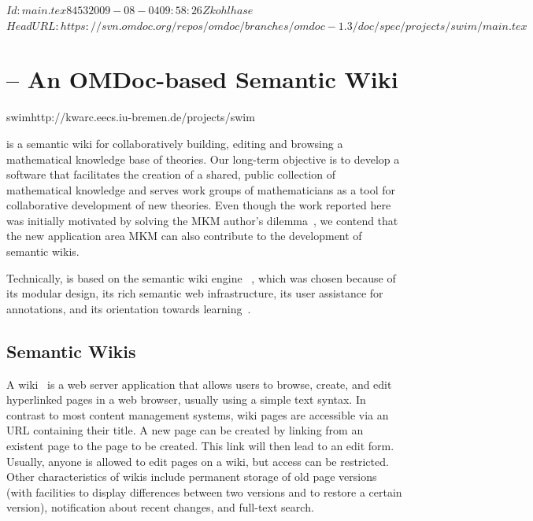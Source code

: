 \svnInfo $Id: main.tex 8453 2009-08-04 09:58:26Z kohlhase $
\svnKeyword $HeadURL: https://svn.omdoc.org/repos/omdoc/branches/omdoc-1.3/doc/spec/projects/swim/main.tex $

\section{{\swim} -- An OMDoc-based Semantic Wiki}
\begin{project}{swim}{http://kwarc.eecs.iu-bremen.de/projects/swim}
\end{project}

{\swim} is a semantic wiki for collaboratively building, editing and browsing a
mathematical knowledge base of {\omdoc} theories. Our long-term objective is to develop a
software that facilitates the creation of a shared, public collection of mathematical
knowledge and serves work groups of mathematicians as a tool for collaborative development
of new theories.  Even though the work reported here was initially motivated by solving
the MKM author's dilemma~\cite{KohKoh:cdad04}, we contend that the new application area
MKM can also contribute to the development of semantic wikis.

Technically, {\swim} is based on the semantic wiki engine
~\cite{schaffert06:ikewiki}, which was chosen because of its
modular design, its rich semantic web infrastructure, its user assistance for
annotations, and its orientation towards
learning~\cite{schaffert06:learning-with-semantic-wikis}.

\subsection{Semantic Wikis}

A wiki~\cite{LeuCun01:wikiway} is a web server
application that allows users to browse, create, and edit hyperlinked pages in a web
browser, usually using a simple text syntax.  In contrast to most content management
systems, wiki pages are accessible via an URL containing their title.  A new page can be
created by linking from an existent page to the page to be created.  This link will then
lead to an edit form.  Usually, anyone is allowed to edit pages on a wiki, but access can
be restricted.  Other characteristics of wikis include permanent storage of old page
versions (with facilities to display differences between two versions and to restore a
certain version), notification about recent changes, and full-text search.

